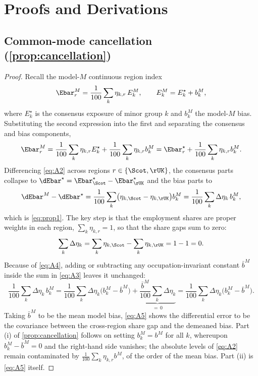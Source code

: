 \section{Proofs and Derivations}\label{app:proofs}

\subsection{Common-mode cancellation (\texorpdfstring{\cref{prop:cancellation}}{Proposition 1})}

\begin{proof}
Recall the model-$M$ continuous region index
\begin{equation}\label{eq:A1}
\Ebar^{M}_r = \frac{1}{100} \sum_k \eta_{k,r}\, E^{M}_k , \qquad
E^{M}_k = E^{\star}_k + b^{M}_k ,
\end{equation}
where $E^{\star}_k$ is the consensus exposure of minor group $k$ and $b^{M}_k$ the model-$M$ bias. Substituting the second expression into the first and separating the consensus and bias components,
\begin{equation}\label{eq:A2}
\Ebar^{M}_r = \frac{1}{100} \sum_k \eta_{k,r} E^{\star}_k + \frac{1}{100} \sum_k \eta_{k,r} b^{M}_k = \Ebar^{\star}_r + \frac{1}{100} \sum_k \eta_{k,r} b^{M}_k .
\end{equation}
Differencing \cref{eq:A2} across regions $r \in \{\Scot, \rUK\}$, the consensus parts collapse to $\dEbar^{\star} = \Ebar^{\star}_{\Scot} - \Ebar^{\star}_{\rUK}$ and the bias parts to
\begin{equation}\label{eq:A3}
\dEbar^{M} - \dEbar^{\star} = \frac{1}{100} \sum_k \bigl(\eta_{k,\Scot} - \eta_{k,\rUK}\bigr) b^{M}_k = \frac{1}{100} \sum_k \Delta\eta_k\, b^{M}_k ,
\end{equation}
which is \cref{eq:prop1}. The key step is that the employment shares are proper weights in each region, $\sum_k \eta_{k,r} = 1$, so that the share gaps sum to zero:
\begin{equation}\label{eq:A4}
\sum_k \Delta\eta_k = \sum_k \eta_{k,\Scot} - \sum_k \eta_{k,\rUK} = 1 - 1 = 0 .
\end{equation}
Because of \cref{eq:A4}, adding or subtracting any occupation-invariant constant $\bar{b}^{M}$ inside the sum in \cref{eq:A3} leaves it unchanged:
\begin{equation}\label{eq:A5}
\frac{1}{100} \sum_k \Delta\eta_k\, b^{M}_k
= \frac{1}{100} \sum_k \Delta\eta_k
\bigl(b^{M}_k - \bar{b}^{M}\bigr)
+ \underbrace{\frac{\bar{b}^{M}}{100} \sum_k
\Delta\eta_k}_{=\,0}
= \frac{1}{100} \sum_k \Delta\eta_k
\bigl(b^{M}_k - \bar{b}^{M}\bigr) .
\end{equation}
Taking $\bar{b}^{M}$ to be the mean model bias, \cref{eq:A5} shows the differential error to be the covariance between the cross-region share gap and the demeaned bias. Part (i) of \cref{prop:cancellation} follows on setting $b^{M}_k = b^{M}$ for all $k$, whereupon $b^{M}_k - \bar{b}^{M} = 0$ and the right-hand side vanishes; the absolute levels of \cref{eq:A2} remain contaminated by $\tfrac{1}{100}\sum_k \eta_{k,r} b^{M}$, of the order of the mean bias. Part (ii) is \cref{eq:A5} itself.
\end{proof}

